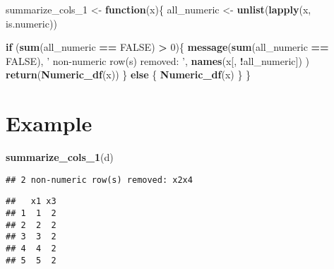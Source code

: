 \documentclass[
]{article}
\newenvironment{Shaded}{\begin{snugshade}}{\end{snugshade}}
\newcommand{\ControlFlowTok}[1]{\textcolor[rgb]{0.13,0.29,0.53}{\textbf{#1}}}
\newcommand{\DecValTok}[1]{\textcolor[rgb]{0.00,0.00,0.81}{#1}}
\newcommand{\KeywordTok}[1]{\textcolor[rgb]{0.13,0.29,0.53}{\textbf{#1}}}
\newcommand{\NormalTok}[1]{#1}
\newcommand{\OperatorTok}[1]{\textcolor[rgb]{0.81,0.36,0.00}{\textbf{#1}}}
\newcommand{\OtherTok}[1]{\textcolor[rgb]{0.56,0.35,0.01}{#1}}
\newcommand{\StringTok}[1]{\textcolor[rgb]{0.31,0.60,0.02}{#1}}
\begin{document}
\begin{Shaded}
\begin{Highlighting}[]
\NormalTok{summarize_cols_}\DecValTok{1}\NormalTok{ <-}\StringTok{ }
\StringTok{  }\ControlFlowTok{function}\NormalTok{(x)\{}
\NormalTok{    all_numeric <-}\StringTok{ }
\StringTok{      }\KeywordTok{unlist}\NormalTok{(}\KeywordTok{lapply}\NormalTok{(x, is.numeric))}
  
    \ControlFlowTok{if}\NormalTok{ (}\KeywordTok{sum}\NormalTok{(all_numeric }\OperatorTok{==}\StringTok{ }\OtherTok{FALSE}\NormalTok{) }\OperatorTok{>}\StringTok{ }\DecValTok{0}\NormalTok{)\{}
      \KeywordTok{message}\NormalTok{(}\KeywordTok{sum}\NormalTok{(all_numeric }\OperatorTok{==}\StringTok{ }\OtherTok{FALSE}\NormalTok{), }
              \StringTok{' non-numeric row(s) removed: '}\NormalTok{, }
              \KeywordTok{names}\NormalTok{(x[, }\OperatorTok{!}\NormalTok{all_numeric])}
\NormalTok{              )}
      \KeywordTok{return}\NormalTok{(}\KeywordTok{Numeric_df}\NormalTok{(x))}
\NormalTok{  \} }\ControlFlowTok{else}\NormalTok{ \{}
    \KeywordTok{Numeric_df}\NormalTok{(x)}
\NormalTok{    \}}
\NormalTok{  \}}
\end{Highlighting}
\end{Shaded}

\hypertarget{example}{%
\section{Example}\label{example}}

\begin{Shaded}
\begin{Highlighting}[]
\KeywordTok{summarize_cols_1}\NormalTok{(d)}
\end{Highlighting}
\end{Shaded}

\begin{verbatim}
## 2 non-numeric row(s) removed: x2x4
\end{verbatim}

\begin{verbatim}
##   x1 x3
## 1  1  2
## 2  2  2
## 3  3  2
## 4  4  2
## 5  5  2
\end{verbatim}
\end{document}
